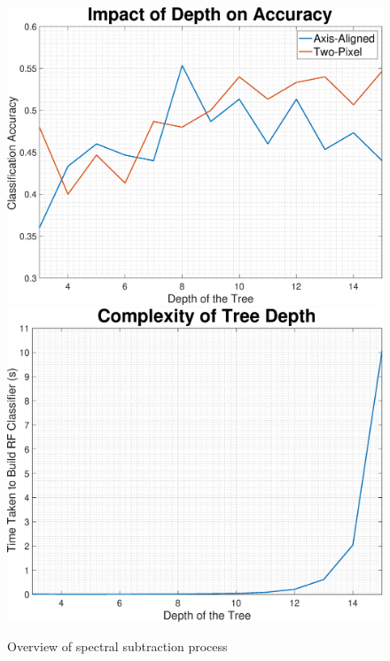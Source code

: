 \documentclass[a4paper,pra,twocolumn,10pt,aps,longbibliography,nobalancelastpage]{revtex4-1}
\begin{document}
\begin{figure}[H]
	\centering
    \includegraphics[width=0.49\columnwidth]{depth_acc}
	\includegraphics[width=0.49\columnwidth]{depth_complexity}
    \caption{Overview of spectral subtraction process}
\end{figure}
\end{document}
